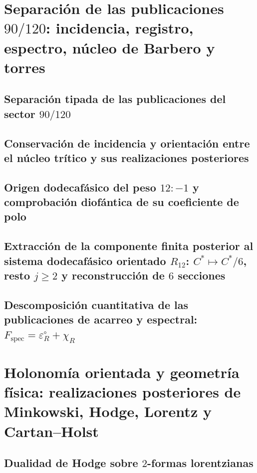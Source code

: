 \section{Separación de las publicaciones \(90/120\): incidencia, registro, espectro, núcleo de Barbero y torres}
\subsection{Separación tipada de las publicaciones del sector \(90/120\)}

\subsection{Conservación de incidencia y orientación entre el núcleo trítico y sus realizaciones posteriores}

\subsection{Origen dodecafásico del peso \(12:-1\) y comprobación diofántica de su coeficiente de polo}

\subsection{Extracción de la componente finita posterior al sistema dodecafásico orientado \(R_{12}\): \(C^*\mapsto C^*/6\), resto \(j\ge2\) y reconstrucción de \(6\) secciones}

\subsection{Descomposición cuantitativa de las publicaciones de acarreo y espectral: \(F_{\mathrm{spec}}=\varepsilon_R^\circ+\chi_R\)}


\section{Holonomía orientada y geometría física: realizaciones posteriores de Minkowski, Hodge, Lorentz y Cartan--Holst}

\subsection{Dualidad de Hodge sobre \(2\)-formas lorentzianas}

